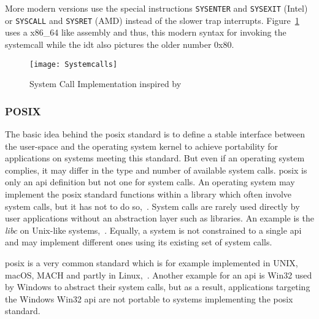 More modern versions use the special instructions \texttt{SYSENTER} and \texttt{SYSEXIT} (Intel) or \texttt{SYSCALL} and \texttt{SYSRET} (AMD) instead of the slower trap interrupts\cite{decade-linux-syscalls}.
Figure~\ref{pic:syscalls} uses a x86\_64 like assembly and thus, this modern syntax for invoking the systemcall while the \ac{idt} also pictures the older number 0x80.

\begin{figure} [t]
	\centering
	\texttt{[image: Systemcalls]}
    \caption{System Call Implementation inspired by~\cite{lfd430}}\label{pic:syscalls}
\end{figure}


\subsubsection{POSIX}
The basic idea behind the \acf{posix} standard is to define a stable interface between the user-space and the operating system kernel to achieve portability for applications on systems meeting this standard.
But even if an operating system complies, it may differ in the type and number of available system calls.
\ac{posix} is only an \ac{api} definition but not one for system calls.
An operating system may implement the \ac{posix} standard functions within a library which often involve system calls, but it has not to do so\cite{lfd430},~\cite{glatz2015betriebssysteme}.
System calls are rarely used directly by user applications without an abstraction layer such as libraries. An example is the \textit{libc} on Unix-like systems\cite{lfd430},~\cite{tanenbaum-modern-operating-systems}.
Equally, a system is not constrained to a single \ac{api} and may implement different ones using its existing set of system calls\cite{glatz2015betriebssysteme}.

\ac{posix} is a very common standard which is for example implemented in UNIX, macOS, MACH and partly in Linux\cite{tanenbaum-modern-operating-systems},~\cite{glatz2015betriebssysteme}. 
Another example for an \ac{api} is Win32 used by Windows to abstract their system calls, but as a result, applications targeting the Windows Win32 \ac{api} are not portable to systems implementing the \ac{posix} standard.


